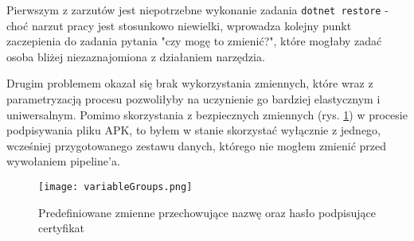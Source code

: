 Pierwszym z zarzutów jest niepotrzebne wykonanie zadania \verb|dotnet restore| - choć narzut pracy 
jest stosunkowo niewielki, wprowadza kolejny punkt zaczepienia do zadania pytania "czy mogę to zmienić?", 
które mogłaby zadać osoba bliżej niezaznajomiona z działaniem narzędzia.

Drugim problemem okazał się brak wykorzystania zmiennych, które wraz z parametryzacją procesu 
pozwoliłyby na uczynienie go bardziej elastycznym i uniwersalnym. Pomimo skorzystania z bezpiecznych 
zmiennych (rys. \ref{img:variableGroups}) w procesie podpisywania pliku APK, 
to byłem w stanie skorzystać wyłącznie z jednego, wcześniej przygotowanego zestawu danych, 
którego nie mogłem zmienić przed wywołaniem pipeline'a.

\begin{figure}[ht]
    \centering
    \texttt{[image: variableGroups.png]}
    \caption{Predefiniowane zmienne przechowujące nazwę oraz hasło podpisujące certyfikat}
    \label{img:variableGroups}
\end{figure}

\newpage

\label{javaTask}